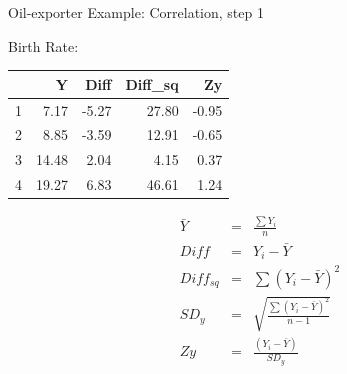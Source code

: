 \documentclass[14pt]{beamer}\usepackage[]{graphicx}\usepackage[]{color}
\begin{document}
\begin{frame}[fragile]{Oil-exporter Example: Correlation, step 1}

\begin{minipage}[ht]{6cm}

{\footnotesize{
Birth Rate:

\begin{table}[ht]
\centering
\begin{tabular}{rrrrr}
  \hline
 & Y & Diff & Diff\_sq & Zy \\ 
  \hline
1 & 7.17 & -5.27 & 27.80 & -0.95 \\ 
  2 & 8.85 & -3.59 & 12.91 & -0.65 \\ 
  3 & 14.48 & 2.04 & 4.15 & 0.37 \\ 
  4 & 19.27 & 6.83 & 46.61 & 1.24 \\ 
   \hline
\end{tabular}
\end{table}

}}
\end{minipage}
\begin{minipage}[ht]{5cm}

{\scriptsize{
\begin{eqnarray*}
\bar{Y} &=& \frac{ \sum Y_i}{n} \\
Diff &=& Y_i - \bar{Y} \\
Diff_{sq} &=& \sum (Y_i - \bar{Y})^2 \\
SD_y &=& \sqrt{ \frac{ \sum ( Y_i - \bar{Y})^2}{n - 1}} \\
Zy &=& \frac{(Y_i - \bar{Y})}{SD_y}
\end{eqnarray*}
}}
\end{minipage}

\end{frame}
\end{document}
